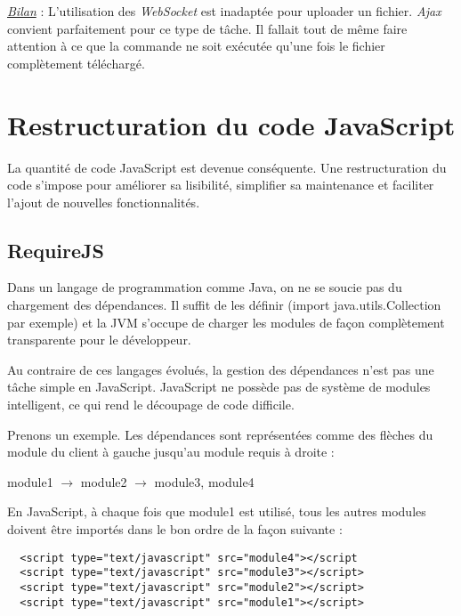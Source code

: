 \underline{\textit{Bilan}} : L'utilisation des \textit{WebSocket} est inadaptée
pour uploader un fichier. \textit{Ajax} convient parfaitement pour ce type de
tâche. Il fallait tout de même faire attention à ce que la commande ne soit
exécutée qu'une fois le fichier complètement téléchargé.

\section{Restructuration du code JavaScript}

La quantité de code JavaScript est devenue conséquente. Une restructuration du
code s'impose pour améliorer sa lisibilité, simplifier sa maintenance et
faciliter l'ajout de nouvelles fonctionnalités.



\subsection{RequireJS}

Dans un langage de programmation comme Java, on ne se soucie pas du chargement
des dépendances. Il suffit de les définir (import java.utils.Collection par
exemple) et la JVM s'occupe de charger les modules de façon complètement
transparente pour le développeur.

Au contraire de ces langages évolués, la gestion des dépendances n'est pas
une tâche simple en JavaScript.
JavaScript ne possède pas de système de modules intelligent, ce qui rend le
découpage de code difficile.

Prenons un exemple. Les dépendances sont représentées comme des flèches du
module du client à gauche jusqu'au module requis à droite :

module1 $\rightarrow$ module2 $\rightarrow$ module3, module4 

En JavaScript, à chaque fois que module1 est utilisé, tous les autres modules
doivent être importés dans le bon ordre de la façon suivante :
\lstset{language=XML}
\begin{lstlisting}
  <script type="text/javascript" src="module4"></script
  <script type="text/javascript" src="module3"></script>
  <script type="text/javascript" src="module2"></script>
  <script type="text/javascript" src="module1"></script>
\end{lstlisting}

